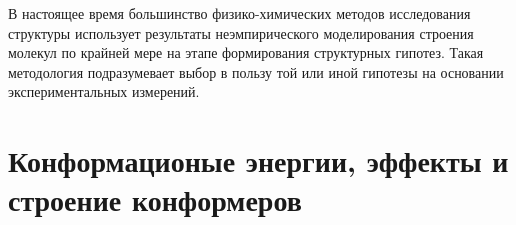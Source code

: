 В настоящее время большинство физико-химических методов исследования структуры использует результаты неэмпирического моделирования строения молекул по крайней мере на этапе формирования структурных гипотез. Такая методология подразумевает выбор в пользу той или иной гипотезы на основании экспериментальных измерений.

\section{Конформационые энергии, эффекты и строение конформеров}